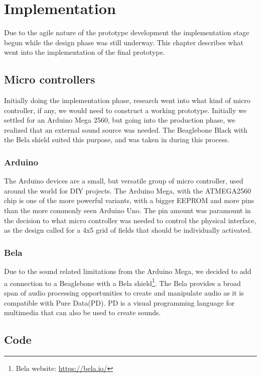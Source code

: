 \chapter{Implementation}%
Due to the agile nature of the prototype development the implementation stage begun while the design phase was still underway. This chapter describes what went into the implementation of the final prototype.

\section{Micro controllers}%
	Initially doing the implementation phase, research went into what kind of micro controller, if any, we would need to construct a working prototype. Initially we settled for an Arduino Mega 2560, but going into the production phase, we realized that an external sound source was needed. The Beaglebone Black with the Bela shield suited this purpose, and was taken in during this process.
	\subsection{Arduino}%
		The Arduino devices are a small, but versatile group of micro controller, used around the world for DIY projects. The Arduino Mega, with the ATMEGA2560 chip is one of the more powerful variants, with a bigger EEPROM and more pins than the more commonly seen Arduino Uno. The pin amount was paramount in the decision to what micro controller was needed to control the physical interface, as the design called for a 4x5 grid of fields that should be individually activated. 
		
	\subsection{Bela}%
		Due to the sound related limitations from the Arduino Mega, we decided to add a connection to a Beaglebone with a Bela shield\footnote{Bela website: \url{https://bela.io/}}. The Bela provides a broad span of audio processing opportunities to create and manipulate audio as it is compatible with Pure Data(PD). PD is a visual programming language for multimedia that can also be used to create sounds.
	
\section{Code}
